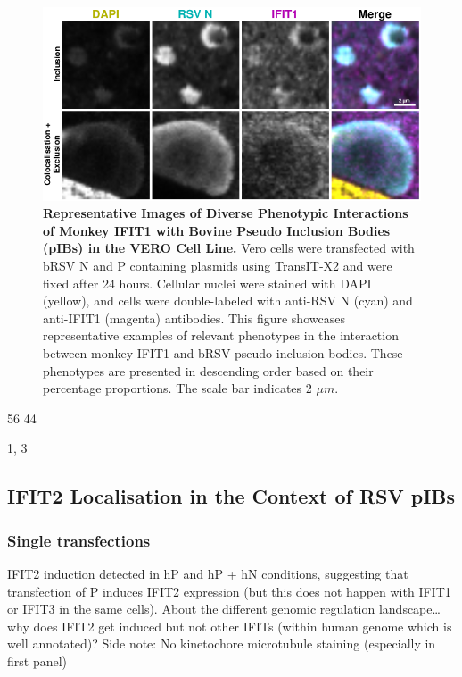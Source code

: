 \begin{figure}
    \centering
    \includegraphics[width=1\linewidth]{08. Chapter 3/Figs/03. pIB/02. IFIT1/09. i1-vero-bnbp.pdf}
    \caption[Representative Images of Diverse Phenotypic Interactions of Monkey IFIT1 with Bovine Pseudo Inclusion Bodies (pIBs) in the VERO Cell Line.]{\textbf{Representative Images of Diverse Phenotypic Interactions of Monkey IFIT1 with Bovine Pseudo Inclusion Bodies (pIBs) in the VERO Cell Line.} Vero cells were transfected with bRSV N and P containing plasmids using TransIT-X2 and were fixed after 24 hours. Cellular nuclei were stained with DAPI (yellow), and cells were double-labeled with anti-RSV N (cyan) and anti-IFIT1 (magenta) antibodies. This figure showcases representative examples of relevant phenotypes in the interaction between monkey IFIT1 and bRSV pseudo inclusion bodies. These phenotypes are presented in descending order based on their percentage proportions. The scale bar indicates 2 \(\mu m\).}
    \label{fig:Representative Images of Diverse Phenotypic Interactions of Monkey IFIT1 with Bovine Pseudo Inclusion Bodies (pIBs) in the VERO Cell Line}
\end{figure}

56 44

1, 3

\subsection{IFIT2 Localisation in the Context of RSV pIBs} \label{subsec:IFIT2 Localisation in the Context of RSV pIBs}
\subsubsection{Single transfections}
IFIT2 induction detected in hP and hP + hN conditions, suggesting that transfection of P induces IFIT2 expression (but this does not happen with IFIT1 or IFIT3 in the same cells).
About the different genomic regulation landscape… why does IFIT2 get induced but not other IFITs (within human genome which is well annotated)? 
Side note: No kinetochore microtubule staining (especially in first panel)

